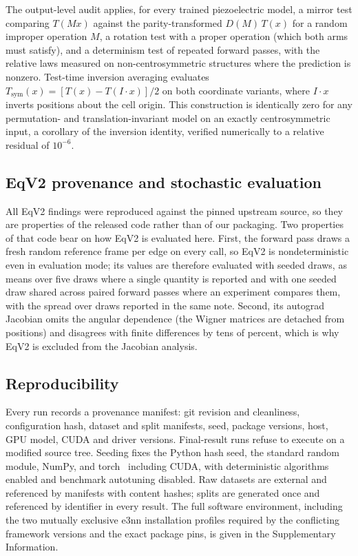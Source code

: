 The output-level audit applies, for every trained piezoelectric model, a mirror test comparing $T(Mx)$ against the parity-transformed $D(M)\,T(x)$ for a random improper operation $M$, a rotation test with a proper operation (which both arms must satisfy), and a determinism test of repeated forward passes, with the relative laws measured on non-centrosymmetric structures where the prediction is nonzero. Test-time inversion averaging evaluates $T_{\mathrm{sym}}(x) = [T(x) - T(I\!\cdot\!x)]/2$ on both coordinate variants, where $I\!\cdot\!x$ inverts positions about the cell origin. This construction is identically zero for any permutation- and translation-invariant model on an exactly centrosymmetric input, a corollary of the inversion identity, verified numerically to a relative residual of $10^{-6}$.

\subsection*{EqV2 provenance and stochastic evaluation}

All EqV2 findings were reproduced against the pinned upstream source, so they are properties of the released code rather than of our packaging. Two properties of that code bear on how EqV2 is evaluated here. First, the forward pass draws a fresh random reference frame per edge on every call, so EqV2 is nondeterministic even in evaluation mode; its values are therefore evaluated with seeded draws, as means over five draws where a single quantity is reported and with one seeded draw shared across paired forward passes where an experiment compares them, with the spread over draws reported in the same note. Second, its autograd Jacobian omits the angular dependence (the Wigner matrices are detached from positions) and disagrees with finite differences by tens of percent, which is why EqV2 is excluded from the Jacobian analysis.

\subsection*{Reproducibility}

Every run records a provenance manifest: git revision and cleanliness, configuration hash, dataset and split manifests, seed, package versions, host, GPU model, CUDA and driver versions. Final-result runs refuse to execute on a modified source tree. Seeding fixes the Python hash seed, the standard random module, NumPy, and torch~\cite{paszke2019pytorch} including CUDA, with deterministic algorithms enabled and benchmark autotuning disabled. Raw datasets are external and referenced by manifests with content hashes; splits are generated once and referenced by identifier in every result. The full software environment, including the two mutually exclusive e3nn installation profiles required by the conflicting framework versions and the exact package pins, is given in the Supplementary Information.

